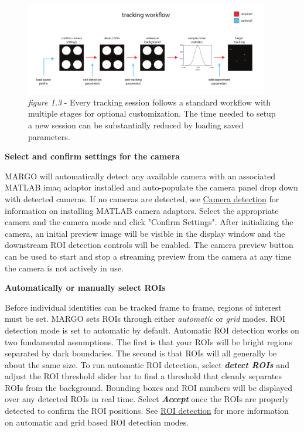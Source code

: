 \documentclass[11pt]{article}
\begin{document}
\begin{figure}[h!]
	\begin{center}
		\includegraphics[width=0.95\textwidth]{images/getting_started/tracking_workflow.pdf}
	\end{center}
	\caption*{\footnotesize {\textit{figure 1.3} - Every tracking session follows a standard workflow with multiple stages for optional customization. The time needed to setup a new session can be substantially reduced by loading saved parameters.}}
\end{figure}

\fontsize{10}{0}
\textbf{Select and confirm settings for the camera}

MARGO will automatically detect any available camera with an associated MATLAB imaq adaptor installed and auto-populate the camera panel drop down with detected cameras. If no cameras are detected, see \hyperlink{camdetect}{Camera detection} for information on installing MATLAB camera adaptors. Select the appropriate camera and the camera mode and click "Confirm Settings". After initializing the camera, an initial preview image will be visible in the display window and the downstream ROI detection controls will be enabled. The camera preview button can be used to start and stop a streaming preview from the camera at any time the camera is not actively in use.

\begin{figure}[h!]
	\begin{center}
	\end{center}
	\footnotesize {}
\end{figure}

\fontsize{10}{0}
\textbf{Automatically or manually select ROIs} 

Before individual identities can be tracked frame to frame, regions of interest must be set. MARGO sets ROIs through either \textit{automatic} or \textit{grid} modes. ROI detection mode is set to automatic by default. Automatic ROI detection works on two fundamental assumptions. The first is that your ROIs will be bright regions separated by dark boundaries. The second is that ROIs will all generally be about the same size. To run automatic ROI detection, select \textbf{\textit{detect ROIs}} and adjust the ROI threshold slider bar to find a threshold that cleanly separates ROIs from the background. Bounding boxes and ROI numbers will be displayed over any detected ROIs in real time. Select \textbf{\textit{Accept}} once the ROIs are properly detected to confirm the ROI positions. See \hyperlink{roidetect}{ROI detection} for more information on automatic and grid based ROI detection modes.
\end{document}
